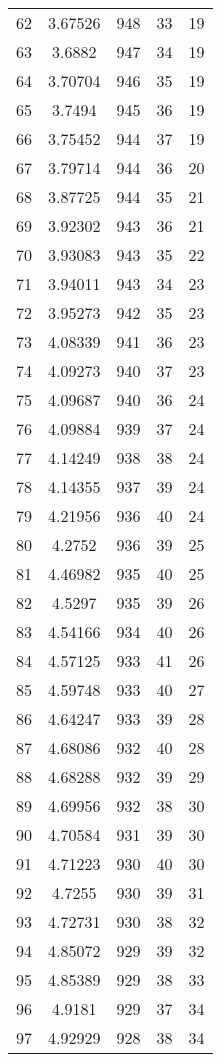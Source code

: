 \documentclass[12pt,a4paper]{article}
\begin{document}
\begin{tabular}{r|cccc}
	62 & 3.67526 & 948 & 33 & 19 \\
	63 & 3.6882 & 947 & 34 & 19 \\
	64 & 3.70704 & 946 & 35 & 19 \\
	65 & 3.7494 & 945 & 36 & 19 \\
	66 & 3.75452 & 944 & 37 & 19 \\
	67 & 3.79714 & 944 & 36 & 20 \\
	68 & 3.87725 & 944 & 35 & 21 \\
	69 & 3.92302 & 943 & 36 & 21 \\
	70 & 3.93083 & 943 & 35 & 22 \\
	71 & 3.94011 & 943 & 34 & 23 \\
	72 & 3.95273 & 942 & 35 & 23 \\
	73 & 4.08339 & 941 & 36 & 23 \\
	74 & 4.09273 & 940 & 37 & 23 \\
	75 & 4.09687 & 940 & 36 & 24 \\
	76 & 4.09884 & 939 & 37 & 24 \\
	77 & 4.14249 & 938 & 38 & 24 \\
	78 & 4.14355 & 937 & 39 & 24 \\
	79 & 4.21956 & 936 & 40 & 24 \\
	80 & 4.2752 & 936 & 39 & 25 \\
	81 & 4.46982 & 935 & 40 & 25 \\
	82 & 4.5297 & 935 & 39 & 26 \\
	83 & 4.54166 & 934 & 40 & 26 \\
	84 & 4.57125 & 933 & 41 & 26 \\
	85 & 4.59748 & 933 & 40 & 27 \\
	86 & 4.64247 & 933 & 39 & 28 \\
	87 & 4.68086 & 932 & 40 & 28 \\
	88 & 4.68288 & 932 & 39 & 29 \\
	89 & 4.69956 & 932 & 38 & 30 \\
	90 & 4.70584 & 931 & 39 & 30 \\
	91 & 4.71223 & 930 & 40 & 30 \\
	92 & 4.7255 & 930 & 39 & 31 \\
	93 & 4.72731 & 930 & 38 & 32 \\
	94 & 4.85072 & 929 & 39 & 32 \\
	95 & 4.85389 & 929 & 38 & 33 \\
	96 & 4.9181 & 929 & 37 & 34 \\
	97 & 4.92929 & 928 & 38 & 34 \\

\end{tabular}
\end{document}
